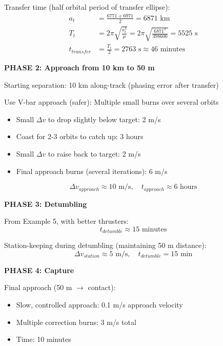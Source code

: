 \documentclass[11pt,a4paper]{article}
\begin{document}
Transfer time (half orbital period of transfer ellipse):
\begin{align}
a_t &= \frac{6771 + 6971}{2} = 6871 \text{ km} \\
T_t &= 2\pi\sqrt{\frac{a_t^3}{\mu}} = 2\pi\sqrt{\frac{6871^3}{398600}} = 5525 \text{ s} \\
t_{transfer} &= \frac{T_t}{2} = 2763 \text{ s} \approx 46 \text{ minutes}
\end{align}

\textbf{PHASE 2: Approach from 10 km to 50 m}

Starting separation: 10 km along-track (phasing error after transfer)

Use V-bar approach (safer): Multiple small burns over several orbits
\begin{itemize}[nosep]
    \item Small $\Delta v$ to drop slightly below target: 2 m/s
    \item Coast for 2-3 orbits to catch up: 3 hours
    \item Small $\Delta v$ to raise back to target: 2 m/s
    \item Final approach burns (several iterations): 6 m/s
\end{itemize}

\begin{equation}
\Delta v_{approach} \approx 10 \text{ m/s}, \quad t_{approach} \approx 6 \text{ hours}
\end{equation}

\textbf{PHASE 3: Detumbling}

From Example 5, with better thrusters:
\begin{equation}
t_{detumble} \approx 15 \text{ minutes}
\end{equation}

Station-keeping during detumbling (maintaining 50 m distance):
\begin{equation}
\Delta v_{station} \approx 5 \text{ m/s}, \quad t_{detumble} = 15 \text{ min}
\end{equation}

\textbf{PHASE 4: Capture}

Final approach (50 m $\rightarrow$ contact):
\begin{itemize}[nosep]
    \item Slow, controlled approach: 0.1 m/s approach velocity
    \item Multiple correction burns: 3 m/s total
    \item Time: 10 minutes
\end{itemize}
\end{document}
